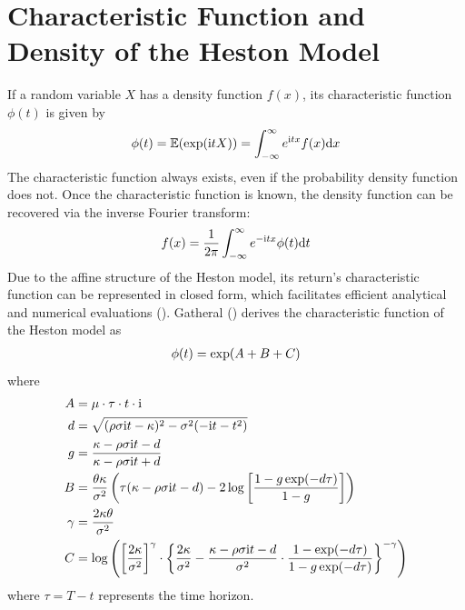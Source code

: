 \section{Characteristic Function and Density of the Heston Model}

If a random variable $X$ has a density function $f(x)$, its characteristic function $\phi(t)$ is given by
\begin{align}
    \phi(t) = \mathbb{E}(\exp(\mathrm{i}tX)) = \int_{-\infty}^{\infty} e^{\mathrm{i}tx}f(x)\mathrm{d}x \notag
\end{align}
The characteristic function always exists, even if the probability density function does not. Once the characteristic function is known, the density function can be recovered via the inverse Fourier transform:
\begin{align}
    f(x) = \frac{1}{2\pi}\int_{-\infty}^{\infty} e^{-\mathrm{i}tx}\phi(t)\mathrm{d}t \notag
\end{align}
Due to the affine structure of the Heston model, its return's characteristic function can be represented in closed form, which facilitates efficient analytical and numerical evaluations (\cite{hestonClosedFormSolutionOptions1993}). Gatheral (\citeyear{gatheralVolatilitySurfacePractitioner2011}) derives the characteristic function of the Heston model as
\begin{align}
    \phi(t) = \exp(A + B + C) \notag
\end{align}
where
\begin{align}
    A &= \mu\cdot\tau\cdot t\cdot\mathrm{i} \notag \\
    d &= \sqrt{(\rho\sigma\mathrm{i}t - \kappa)^2 - \sigma^2(-\mathrm{i}t - t^2)} \notag \\
    g &= \frac{\kappa - \rho\sigma\mathrm{i}t - d}{\kappa - \rho\sigma\mathrm{i}t + d} \notag \\
    B &= \frac{\theta\kappa}{\sigma^2}\left(\tau(\kappa - \rho\sigma\mathrm{i}t - d) - 2\log\left[\frac{1-g\exp(-d\tau)}{1-g}\right]\right) \notag \\
    \gamma &= \frac{2\kappa\theta}{\sigma^2} \notag \\
    \label{eq:heston_model_characteristic_function_C}
    C &= \log\left(\left[\frac{2\kappa}{\sigma^2}\right]^{\gamma}\cdot \left\lbrace \frac{2\kappa}{\sigma^2} - \frac{\kappa - \rho\sigma\mathrm{i}t - d}{\sigma^2}\cdot\frac{1 - \exp(-d\tau)}{1-g\exp(-d\tau)} \right\rbrace^{-\gamma}\right)
\end{align}
where $\tau = T-t$ represents the time horizon.

